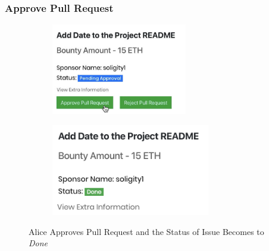 \documentclass[12pt]{article}
\renewcommand{\_}{\kern-1.5pt\textunderscore\kern-1.5pt}
\begin{document}
\subsubsection{Approve Pull Request}

\begin{figure}[H]
	\centering
	\begin{subfigure}[b]{.45\textwidth}
		\centering
		\includegraphics[height=4cm]{graphs/40. alice_approve_pull_request}
	\end{subfigure}
	\begin{subfigure}[b]{.45\textwidth}
		\centering
		\includegraphics[height=4cm]{graphs/41. issue_status_done}
	\end{subfigure}
	\caption{Alice Approves Pull Request and the Status of Issue Becomes to \textit{Done}}
\end{figure}
\end{document}
